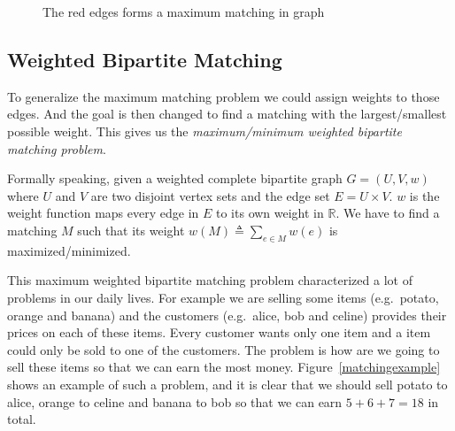 \begin{figure}\centering
{}
\label{maximummatching}
\caption{The red edges forms a maximum matching in graph}
\end{figure}

\subsection{Weighted Bipartite Matching}

To generalize the maximum matching problem we could assign weights to those
edges. And the goal is then changed to find a matching with the 
largest/smallest possible weight. This gives us the \emph{maximum/minimum
weighted bipartite matching problem}.

Formally speaking, given a weighted complete bipartite graph
$G = (U, V, w)$ where $U$ and $V$ are two disjoint vertex sets and the edge
set $E = U \times V$. $w$ is the weight function maps every edge in $E$ 
to its own weight in $\mathbb{R}$. We have to find a matching $M$ such that
its weight $w(M) \triangleq \sum_{e \in M} w(e)$ is maximized/minimized.

This maximum weighted bipartite matching problem characterized a lot of
problems in our daily lives. For example we are selling some items 
(e.g.\ potato, orange and banana) and the customers 
(e.g.\ alice, bob and celine) provides their prices on each of these items.
Every customer wants only one item and a item could only be sold to one of
the customers. The problem is how are we going to sell these items so that
we can earn the most money. Figure~\ref{matchingexample} shows an example
of such a problem, and it is clear that we should sell potato to alice, 
orange to celine and banana to bob so that we can earn $5 + 6 + 7 = 18$ in
total.

